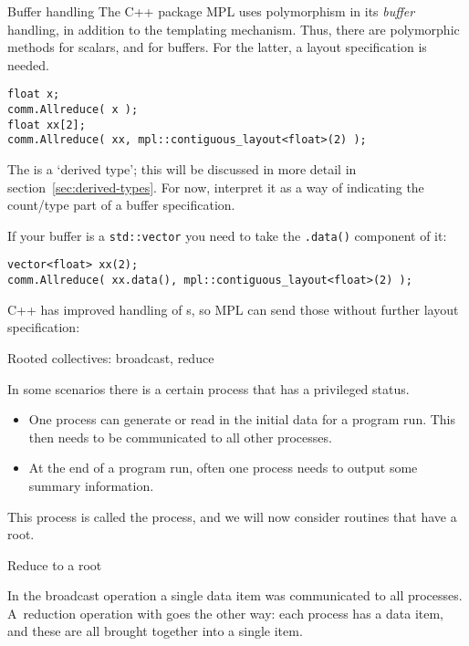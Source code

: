 \begin{mplnote}{Buffer handling}
  The C++ package \ac{MPL} uses polymorphism in its
  \emph{buffer} handling,
  in addition to the templating mechanism.
  Thus, there are polymorphic methods for scalars,
  and for buffers. For the latter, a layout specification is needed.
\lstset{language=C++}
\begin{lstlisting}
float x;
comm.Allreduce( x );
float xx[2];
comm.Allreduce( xx, mpl::contiguous_layout<float>(2) );
\end{lstlisting}
The  is a `derived type';
this will be discussed in more detail in
section~\ref{sec:derived-types}.
For now, interpret it as a way of indicating the count/type
part of a buffer specification.

If your buffer is a \lstinline+std::vector+ you need
to take the \lstinline+.data()+ component of it:
\begin{lstlisting}
vector<float> xx(2);
comm.Allreduce( xx.data(), mpl::contiguous_layout<float>(2) );
\end{lstlisting}

C++ has improved handling of s,
so \ac{MPL} can send those without further layout specification:
%
\end{mplnote}

\lstset{language=C}

 {Rooted collectives: broadcast, reduce}
\label{sec:rooted}

In some scenarios there is a certain process that has a privileged status.
\begin{itemize}
\item
  One process can generate or read in the initial data for a program
  run. This then needs to be communicated to all other processes.
\item
  At the end of a program run, often
  one process needs to output some summary information.
\end{itemize}
This process is called the  process, and we will now
consider routines that have a root.

 {Reduce to a root}
\label{sec:reduce-root}

In the broadcast operation a single data item was communicated to all
processes. A~reduction operation with
%
%
goes the other way: each process has a
data item, and these are all brought together into a single item.

